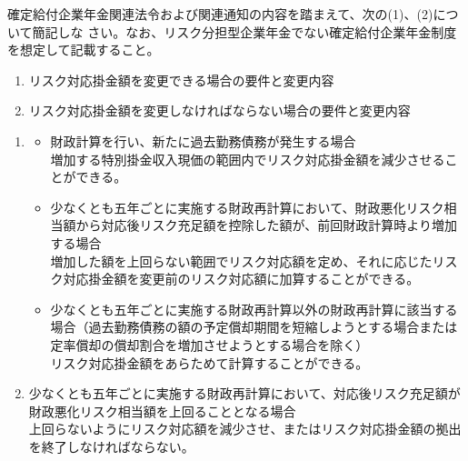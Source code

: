 \begin{shortanswer}
  確定給付企業年金関連法令および関連通知の内容を踏まえて、次の(1)、(2)について簡記しな
さい。なお、リスク分担型企業年金でない確定給付企業年金制度を想定して記載すること。\\

\begin{enumerate}[(1)]
  \item リスク対応掛金額を変更できる場合の要件と変更内容\\
  \item リスク対応掛金額を変更しなければならない場合の要件と変更内容
\end{enumerate}
\end{shortanswer}

\begin{answerbox}
  \begin{enumerate}[(1)]
    \item \begin{itemize}
      \item 財政計算を行い、新たに過去勤務債務が発生する場合\\
増加する特別掛金収入現価の範囲内でリスク対応掛金額を減少させることができる。
\\
      \item 少なくとも五年ごとに実施する財政再計算において、財政悪化リスク相当額から対応後リスク充足額を控除した額が、前回財政計算時より増加する場合\\
増加した額を上回らない範囲でリスク対応額を定め、それに応じたリスク対応掛金額を変更前のリスク対応額に加算することができる。
\\
      \item 少なくとも五年ごとに実施する財政再計算以外の財政再計算に該当する場合（過去勤務債務の額の予定償却期間を短縮しようとする場合または定率償却の償却割合を増加させようとする場合を除く）\\
リスク対応掛金額をあらためて計算することができる。\\
    \end{itemize}
    
    \item 少なくとも五年ごとに実施する財政再計算において、対応後リスク充足額が財政悪化リスク相当額を上回ることとなる場合\\
上回らないようにリスク対応額を減少させ、またはリスク対応掛金額の拠出を終了しなければならない。
  \end{enumerate}
\end{answerbox}

